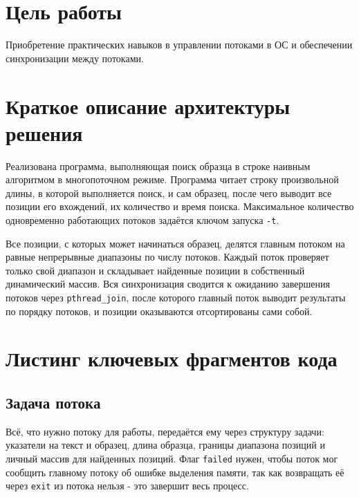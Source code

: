 \documentclass[a4paper,12pt]{article}
\begin{document}
\maketitlepage

\section{Цель работы}

Приобретение практических навыков в управлении потоками в ОС и обеспечении синхронизации между потоками.

\section{Краткое описание архитектуры решения}

Реализована программа, выполняющая поиск образца в строке наивным алгоритмом в многопоточном режиме. Программа читает строку произвольной длины, в которой выполняется поиск, и сам образец, после чего выводит все позиции его вхождений, их количество и время поиска. Максимальное количество одновременно работающих потоков задаётся ключом запуска \texttt{-t}.

Все позиции, с которых может начинаться образец, делятся главным потоком на равные непрерывные диапазоны по числу потоков. Каждый поток проверяет только свой диапазон и складывает найденные позиции в собственный динамический массив. Вся синхронизация сводится к ожиданию завершения потоков через \texttt{pthread\_join}, после которого главный поток выводит результаты по порядку потоков, и позиции оказываются отсортированы сами собой.

\section{Листинг ключевых фрагментов кода}

\subsection{Задача потока}

Всё, что нужно потоку для работы, передаётся ему через структуру задачи: указатели на текст и образец, длина образца, границы диапазона позиций и личный массив для найденных позиций. Флаг \texttt{failed} нужен, чтобы поток мог сообщить главному потоку об ошибке выделения памяти, так как возвращать её через \texttt{exit} из потока нельзя - это завершит весь процесс.
\end{document}
